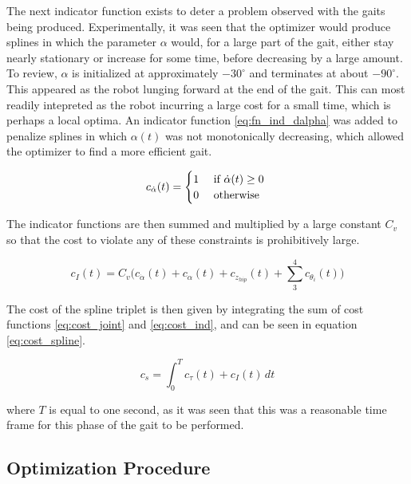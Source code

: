 The next indicator function exists to deter a problem observed with the gaits being produced. 
Experimentally, it was seen that the optimizer would produce splines in which the parameter
$\alpha$ would, for a large part of the gait, either stay nearly stationary or increase for some time, before
decreasing by a large amount.
To review, $\alpha$ is initialized at approximately $-30^\circ$ and terminates at about $-90^\circ$.
This appeared as the robot lunging forward at the end of the gait.
This can most readily intepreted as the robot incurring a large cost for a small time, which is perhaps
a local optima. An indicator function \ref{eq:fn_ind_dalpha} was added to penalize splines in which 
$\alpha (t)$ was not monotonically decreasing, which allowed the optimizer to find a more efficient gait.

\begin{equation} 
	c_{\dot \alpha}(t) =
  	\begin{cases} 
    	\hfill 1 \hfill & \text{ if $\dot \alpha(t) \ge 0$ } \\
      \hfill 0 \hfill & \text{ otherwise }
  	\end{cases} \label{eq:fn_ind_dalpha}
\end{equation}

The indicator functions are then summed and multiplied by a large constant $C_v$ so that the cost to
violate any of these constraints is prohibitively large.

\begin{equation}
	c_I(t) = C_v \Big( c_{\dot \alpha}(t) + c_{\alpha}(t) + c_{z_{hip}}(t) + \sum_3^4 c_{\theta_i}(t) \Big) \label{eq:cost_ind}
\end{equation}

The cost of the spline triplet is then given by integrating the sum of cost functions \ref{eq:cost_joint} and
\ref{eq:cost_ind}, and can be seen in equation \ref{eq:cost_spline}.

\begin{equation}
c_s = \int_0^T c_{\tau}(t) + c_I(t) \, dt \label{eq:cost_spline}
\end{equation}

where $T$ is equal to one second, as it was seen that this was a reasonable time frame for this phase of the gait
to be performed. 

\subsection{Optimization Procedure}

